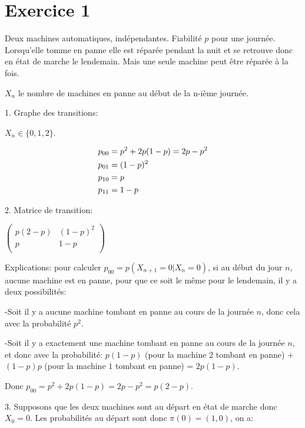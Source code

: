 \documentclass[a4paper,twoside,12pt]{article}
\title{\MYTITLE}
\author{\textsc{Do} Quoc Khanh}
\date{\today}
\begin{document}
\maketitle
\pagestyle{fancy}

\section{Exercice 1}
Deux machines automatiques, indépendantes.
Fiabilité $p$ pour une journée. Lorsqu'elle tomme en panne elle est réparée pendant la nuit et se retrouve donc en état de marche le lendemain. Mais une seule machine peut être réparée à la fois.

$X_n$ le nombre de machines en panne au début de la n-ième journée.

1. Graphe des transitions:

$X_n \in \{0, 1, 2\}$.

\begin{align}
    p_{00} &= p^2 + 2p(1-p) = 2p - p^2 \notag \\
    p_{01} &= (1-p)^2 \notag \\
    p_{10} &= p \notag \\
    p_{11} &= 1-p \notag
\end{align}

2. Matrice de transition:

$ \left( 
\begin{array}{cc}
p(2-p) & (1-p)^2 \\
p & 1-p \\
\end{array} 
\right)$

Explications: pour calculer $p_{00} = p(X_{n+1}=0\vert X_n = 0)$, si au début du jour $n$, aucune machine est en panne, pour que ce soit le même pour le lendemain, il y a deux possibilités:

-Soit il y a aucune machine tombant en panne au cours de la journée $n$, donc cela avec la probabilité $p^2$.

-Soit il y a exactement une machine tombant en panne au cours de la journée $n$, et donc avec la probabilité: $p(1-p)$ (pour la machine $2$ tombant en panne) $+$ $(1-p)p$ (pour la machine $1$ tombant en panne) = $2p(1-p)$.

Donc $p_{00} = p^2 + 2p(1-p) = 2p - p^2 = p(2-p)$.

3. Supposons que les deux machines sont au départ en état de marche donc $X_0 = 0$. Les probabilités au départ sont donc $\pi(0) = (1, 0)$, on a:
\end{document}
